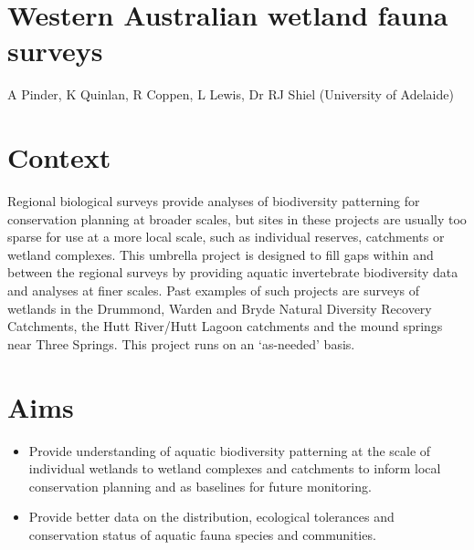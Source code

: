 \documentclass[version=last,
    paper=a4, %
    10pt, %
    usenames,
    dvipsnames,
    oneside, %
    headings=openany, %
    DIV=15 %
]{scrbook}
\begin{document}
\section*{Western Australian wetland fauna surveys
}

A Pinder, K Quinlan, R Coppen, L Lewis, Dr RJ Shiel (University of
Adelaide)


\section*{Context}
Regional biological surveys provide analyses of biodiversity patterning
for conservation planning at broader scales, but sites in these projects
are usually too sparse for use at a more local scale, such as individual
reserves, catchments or wetland complexes. This umbrella project is
designed to fill gaps within and between the regional surveys by
providing aquatic invertebrate biodiversity data and analyses at finer
scales. Past examples of such projects are surveys of wetlands in the
Drummond, Warden and Bryde Natural Diversity Recovery Catchments, the
Hutt River/Hutt Lagoon catchments and the mound springs near Three
Springs. This project runs on an `as-needed' basis.



\section*{Aims}
\begin{itemize}
\itemsep1pt\parskip0pt
\item
  Provide understanding of aquatic biodiversity patterning at the scale
  of individual wetlands to wetland complexes and catchments to inform
  local conservation planning and as baselines for future monitoring.
\item
  Provide better data on the distribution, ecological tolerances and
  conservation status of aquatic fauna species and communities.
\end{itemize}
\end{document}
